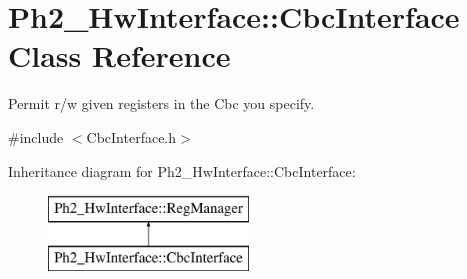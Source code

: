 \hypertarget{class_ph2___hw_interface_1_1_cbc_interface}{\section{Ph2\-\_\-\-Hw\-Interface\-:\-:Cbc\-Interface Class Reference}
\label{class_ph2___hw_interface_1_1_cbc_interface}
}


Permit r/w given registers in the Cbc you specify.  




{\ttfamily \#include $<$Cbc\-Interface.\-h$>$}

Inheritance diagram for Ph2\-\_\-\-Hw\-Interface\-:\-:Cbc\-Interface\-:\begin{figure}[H]
\begin{center}
\leavevmode
\includegraphics[height=2.000000cm]{class_ph2___hw_interface_1_1_cbc_interface}
\end{center}
\end{figure}
